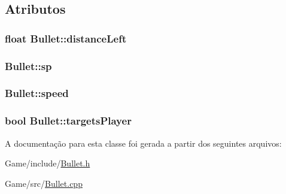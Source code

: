 \subsection{Atributos}
\hypertarget{classBullet_ac24a38eea713d69e34c090416177b426}{
\subsubsection[{distance\+Left}]{\setlength{\rightskip}{0pt plus 5cm}float Bullet\+::distance\+Left\hspace{0.3cm}{\ttfamily [private]}}}\label{classBullet_ac24a38eea713d69e34c090416177b426}
\hypertarget{classBullet_a3b796813022508f0f5f821c2a90ac863}{
\subsubsection[{sp}]{ Bullet\+::sp\hspace{0.3cm}{\ttfamily [private]}}}\label{classBullet_a3b796813022508f0f5f821c2a90ac863}
\hypertarget{classBullet_a9674d36173dafc258455bbaa9b39b326}{
\subsubsection[{speed}]{ Bullet\+::speed\hspace{0.3cm}{\ttfamily [private]}}}\label{classBullet_a9674d36173dafc258455bbaa9b39b326}
\hypertarget{classBullet_a57270bc61a381861bd548a7f2466bca2}{
\subsubsection[{targets\+Player}]{\setlength{\rightskip}{0pt plus 5cm}bool Bullet\+::targets\+Player\hspace{0.3cm}{\ttfamily [private]}}}\label{classBullet_a57270bc61a381861bd548a7f2466bca2}


A documentação para esta classe foi gerada a partir dos seguintes arquivos\+:\begin{DoxyCompactItemize}
\item 
Game/include/\hyperlink{Bullet_8h}{Bullet.\+h}\item 
Game/src/\hyperlink{Bullet_8cpp}{Bullet.\+cpp}\end{DoxyCompactItemize}
